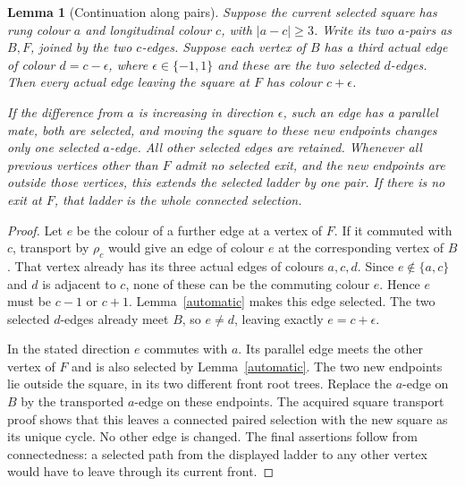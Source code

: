 \documentclass[11pt,a4paper]{article}
\newtheorem{lemma}[theorem]{Lemma}
\begin{document}
\begin{lemma}[Continuation along pairs]\label{continue}
Suppose the current selected square has rung colour $a$ and
longitudinal colour $c$, with $|a-c|\ge3$. Write its two
$a$-pairs as $B,F$, joined by the two $c$-edges. Suppose each
vertex of $B$ has a third actual edge of colour $d=c-\epsilon$,
where $\epsilon\in\{-1,1\}$ and these are the two selected
$d$-edges. Then every actual edge leaving the square at $F$
has colour $c+\epsilon$.

If the difference from $a$ is increasing in direction $\epsilon$,
such an edge has a parallel mate, both are selected, and moving
the square to these new endpoints changes only one selected
$a$-edge. All other selected edges are retained. Whenever all
previous vertices other than $F$ admit no selected exit, and
the new endpoints are outside those vertices, this extends the
selected ladder by one pair. If there is no exit at $F$, that
ladder is the whole connected selection.
\end{lemma}
\begin{proof}
Let $e$ be the colour of a further edge at a vertex of $F$.
If it commuted with $c$, transport by $\rho_c$ would give an
edge of colour $e$ at the corresponding vertex of $B$. That
vertex already has its three actual edges of colours $a,c,d$.
Since $e\notin\{a,c\}$ and $d$ is adjacent to $c$, none of
these can be the commuting colour $e$. Hence $e$ must be
$c-1$ or $c+1$. Lemma~\ref{automatic} makes this edge
selected. The two selected $d$-edges already meet $B$, so
$e\ne d$, leaving exactly $e=c+\epsilon$.

In the stated direction $e$ commutes with $a$. Its parallel
edge meets the other vertex of $F$ and is also selected by
Lemma~\ref{automatic}. The two new endpoints lie outside
the square, in its two different front root trees. Replace
the $a$-edge on $B$ by the transported $a$-edge on these
endpoints. The acquired square transport proof shows that
this leaves a connected paired selection with the new square
as its unique cycle. No other edge is changed. The final
assertions follow from connectedness: a selected path from
the displayed ladder to any other vertex would have to leave
through its current front.
\end{proof}
\end{document}
